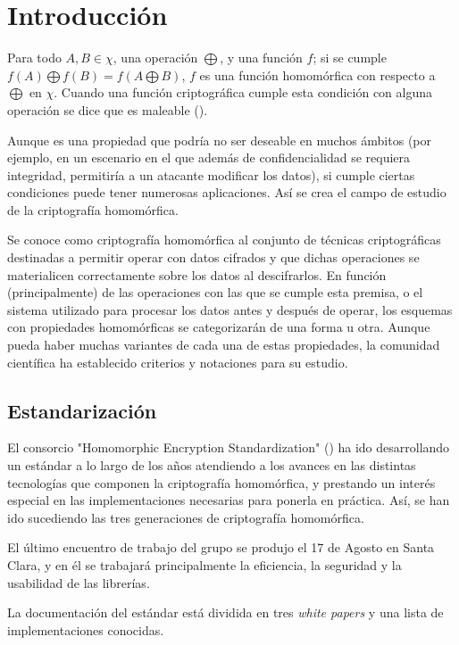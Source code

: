 \chapter{Introducción}
\label{chap:intro}

Para todo $ A,B \in \chi{} $, una operación $ \bigoplus $, y una función $f$; si se cumple $ f(A) \bigoplus f(B) = f(A \bigoplus B)$, $ f $ es una función homomórfica con respecto a $ \bigoplus $ en $ \chi{} $. Cuando una función criptográfica cumple esta condición con alguna operación se dice que es maleable (\cite{dolev_non-malleable_1991}).

Aunque es una propiedad que podría no ser deseable en muchos ámbitos (por ejemplo, en un escenario en el que además de confidencialidad se requiera integridad, permitiría a un atacante modificar los datos), si cumple ciertas condiciones puede tener numerosas aplicaciones. Así se crea el campo de estudio de la criptografía homomórfica.

Se conoce como criptografía homomórfica al conjunto de técnicas criptográficas destinadas a permitir operar con datos cifrados y que dichas operaciones se materialicen correctamente sobre los datos al descifrarlos. En función (principalmente) de las operaciones con las que se cumple esta premisa, o el sistema utilizado para procesar los datos antes y después de operar, los esquemas con propiedades homomórficas se categorizarán de una forma u otra. Aunque pueda haber muchas variantes de cada una de estas propiedades, la comunidad científica ha establecido criterios y notaciones para su estudio.

\section{Estandarización}

El consorcio "Homomorphic Encryption Standardization" (\cite{albrecht_homomorphic_2018}) ha ido desarrollando un estándar a lo largo de los años atendiendo a los avances en las distintas tecnologías que componen la criptografía homomórfica, y prestando un interés especial en las implementaciones necesarias para ponerla en práctica. Así, se han ido sucediendo las tres generaciones de criptografía homomórfica.

El último encuentro de trabajo del grupo se produjo el 17 de Agosto en Santa Clara, y en él se trabajará principalmente la eficiencia, la seguridad y la usabilidad de las librerías.

La documentación del estándar está dividida en tres \textit{white papers} y una lista de implementaciones conocidas.

